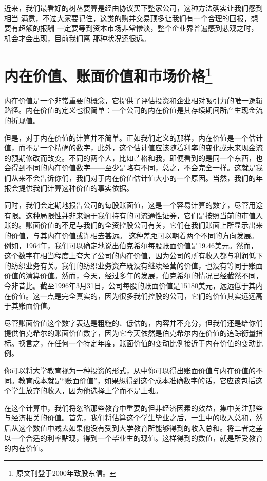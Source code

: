 \documentclass[UTF8,a4paper,zihao=-4,fontset = windows]{ctexart} %
\begin{document}
近来，我们最看好的树丛要算是经由协议买下整家公司，这种方法确实让我们感到相当
满意，不过大家要记住，这类的购并交易顶多让我们有一个合理的回报，想要有超额的报酬
一定要等到资本市场非常惨淡，整个企业界普遍感到悲观之时，机会才会出现，目前我们离
那种状况还很远。

\section[内在价值、账面价值和市场价格]{内在价值、账面价值和市场价格\footnote{原文刊登于2000年致股东信。}}

内在价值是一个非常重要的概念，它提供了评估投资和企业相对吸引力的唯一逻辑路径。内在价值的定义也很简单：一个公司的内在价值是其存续期间所产生现金流的折现值。

但是，对于内在价值的计算并不简单。正如我们定义的那样，内在价值是一个估计值，而不是一个精确的数字，此外，这个估计值应该随着利率的变化或未来现金流的预期修改而改变。不同的两个人，比如芒格和我，即便看到的是同一个东西，也会得到不同的内在价值数字——至少是略有不同，总之，不会完全一样。这就是我们从来不会告诉你们，我们对于内在价值估计值大小的一个原因。当然，我们的年报会提供我们计算这种价值的事实依据。

同时，我们会定期地报告公司的每股账面值，这是一个容易计算的数字，尽管用途有限。这种局限性并非来源于我们持有的可流通性证券，它们是按照当前的市值入账的。账面价值的不足与我们的全资控股公司有关，它们在我们账面上所显示出来的价值，与其内在价值或许相去甚远。
这种差距可以朝着两个不同的方向发展。例如，1964年，我们可以确定地说出伯克希尔每股账面价值是19.46美元。然而，这个数字在相当程度上夸大了公司的内在价值，因为公司的所有收入都与利润低下的纺织业务有关。我们的纺织业务资产既没有继续经营的价值，也没有等同于账面价值的清算价值。然而，今天，经过多年的发展，伯克希尔的情况已经截然不同，今非昔比。截至1996年3月31日，公司每股的账面价值是15180美元，远远低于其内在价值。这一点是完全真实的，因为很多我们控股的公司，它们的价值其实远远高于其账面价值。

尽管账面价值这个数字表达是粗糙的、低估的，内容并不充分，但我们还是给你们提供伯克希尔的账面价值数字，因为它今天依然是伯克希尔内在价值的追踪衡量指标。换言之，在任何一个特定年度，账面价值的变动比例接近于内在价值的变动比例。

你可以将大学教育视为一种投资的形式，从中你可以得出账面价值与内在价值的不同。教育成本就是“账面价值”，如果想得到这个成本准确数字的话，它应该包括这个学生放弃的收入，因为他选择上学而不是上班。

在这个计算中，我们将忽略那些教育中重要的但非经济因素的效益，集中关注那些与经济相关的价值。首先，我们将估算这个学生毕业之后，一生中的收入总和，然后从这个数值中减去如果他没有受到大学教育所能够得到的收入总和。将二者之差以一个合适的利率贴现，得到一个毕业生的现值。这样得到的数值，就是所受教育的内在价值。
\end{document}
